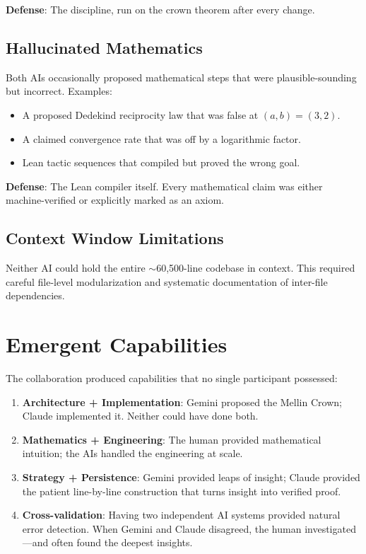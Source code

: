 \documentclass[11pt,a4paper]{article}
\begin{document}
\textbf{Defense}: The  discipline, run on the
crown theorem after every change.

\subsection{Hallucinated Mathematics}

Both AIs occasionally proposed mathematical steps that were
plausible-sounding but incorrect. Examples:
\begin{itemize}
  \item A proposed Dedekind reciprocity law that was false at
    $(a,b) = (3,2)$.
  \item A claimed convergence rate that was off by a logarithmic
    factor.
  \item Lean tactic sequences that compiled but proved the wrong
    goal.
\end{itemize}

\textbf{Defense}: The Lean compiler itself. Every mathematical claim
was either machine-verified or explicitly marked as an axiom.

\subsection{Context Window Limitations}

Neither AI could hold the entire $\sim$60{,}500-line codebase in context.
This required careful file-level modularization and systematic
documentation of inter-file dependencies.

\section{Emergent Capabilities}

The collaboration produced capabilities that no single participant
possessed:

\begin{enumerate}
  \item \textbf{Architecture + Implementation}: Gemini proposed the
    Mellin Crown; Claude implemented it. Neither could have done both.
  \item \textbf{Mathematics + Engineering}: The human provided
    mathematical intuition; the AIs handled the engineering at scale.
  \item \textbf{Strategy + Persistence}: Gemini provided leaps of
    insight; Claude provided the patient line-by-line construction
    that turns insight into verified proof.
  \item \textbf{Cross-validation}: Having two independent AI systems
    provided natural error detection. When Gemini and Claude disagreed,
    the human investigated---and often found the deepest insights.
\end{enumerate}
\end{document}

